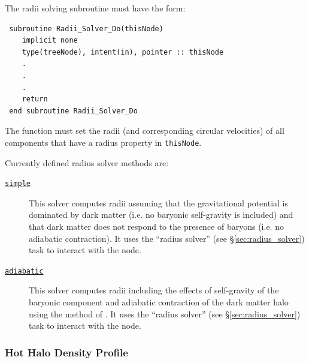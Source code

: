 The radii solving subroutine must have the form:
\begin{verbatim}
 subroutine Radii_Solver_Do(thisNode)
    implicit none
    type(treeNode), intent(in), pointer :: thisNode
    .
    .
    .
    return
 end subroutine Radii_Solver_Do
\end{verbatim}
The function must set the radii (and corresponding circular velocities) of all components that have a radius property in {\tt thisNode}.

Currently defined radius solver methods are:
\begin{description}
 \item [\hyperlink{galactic_structure.radius_solver.simple.F90:galactic_structure_radii_simple:galactic_structure_radii_solve_simple}{{\tt simple}}] This solver computes radii assuming that the gravitational potential is dominated by dark matter (i.e. no baryonic self-gravity is included) and that dark matter does not respond to the presence of baryons (i.e. no adiabatic contraction). It uses the ``radius solver'' (see \S\ref{sec:radius_solver}) task to interact with the node.
 \item [\hyperlink{galactic_structure.radius_solver.adiabatic.F90:galactic_structure_radii_adiabatic:galactic_structure_radii_solve_adiabatic}{{\tt adiabatic}}] This solver computes radii including the effects of self-gravity of the baryonic component and adiabatic contraction of the dark matter halo using the method of \cite{gnedin_response_2004}. It uses the ``radius solver'' (see \S\ref{sec:radius_solver}) task to interact with the node.
\end{description}

\subsubsection{Hot Halo Density Profile}

